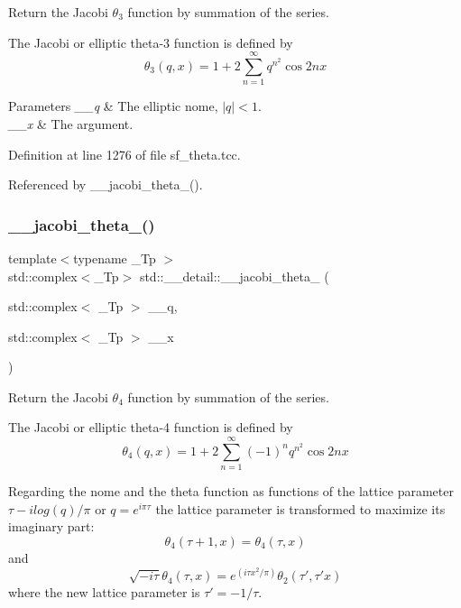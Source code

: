 Return the Jacobi $ \theta_3 $ function by summation of the series.

The Jacobi or elliptic theta-\/3 function is defined by \[ \theta_3(q,x) = 1 + 2\sum_{n=1}^{\infty} q^{n^2}\cos{2nx} \]


\begin{DoxyParams}{Parameters}
{\em \+\_\+\+\_\+q} & The elliptic nome, $ |q| < 1 $. \\
\hline
{\em \+\_\+\+\_\+x} & The argument. \\
\hline
\end{DoxyParams}


Definition at line 1276 of file sf\+\_\+theta.\+tcc.



Referenced by \+\_\+\+\_\+jacobi\+\_\+theta\+\_().

\mbox{\label{namespacestd_1_1____detail_a1cb3d69015e808baeaf98cd3310f38c3}} 
\subsubsection{\texorpdfstring{\+\_\+\+\_\+jacobi\+\_\+theta\+\_()}{\_\_jacobi\_theta\_4()}\hspace{0.1cm}{\footnotesize\ttfamily [1/2]}}
{\footnotesize\ttfamily template$<$typename \+\_\+\+Tp $>$ \\
std\+::complex$<$\+\_\+\+Tp$>$ std\+::\+\_\+\+\_\+detail\+::\+\_\+\+\_\+jacobi\+\_\+theta\+\_ (\begin{DoxyParamCaption}\item[{std\+::complex$<$ \+\_\+\+Tp $>$}]{\+\_\+\+\_\+q,  }\item[{std\+::complex$<$ \+\_\+\+Tp $>$}]{\+\_\+\+\_\+x }\end{DoxyParamCaption})}

Return the Jacobi $ \theta_4 $ function by summation of the series.

The Jacobi or elliptic theta-\/4 function is defined by \[ \theta_4(q,x) = 1 + 2\sum_{n=1}^{\infty}(-1)^n q^{n^2}\cos{2nx} \]

Regarding the nome and the theta function as functions of the lattice parameter $ \tau -i log(q)/ \pi $ or $ q = e^{i\pi\tau} $ the lattice parameter is transformed to maximize its imaginary part\+: \[ \theta_4(\tau+1,x) = \theta_4(\tau,x) \] and \[ \sqrt{-i\tau}\theta_4(\tau,x) = e^{(i\tau x^2/\pi)}\theta_2(\tau',\tau' x) \] where the new lattice parameter is $ \tau' = -1/\tau $.


